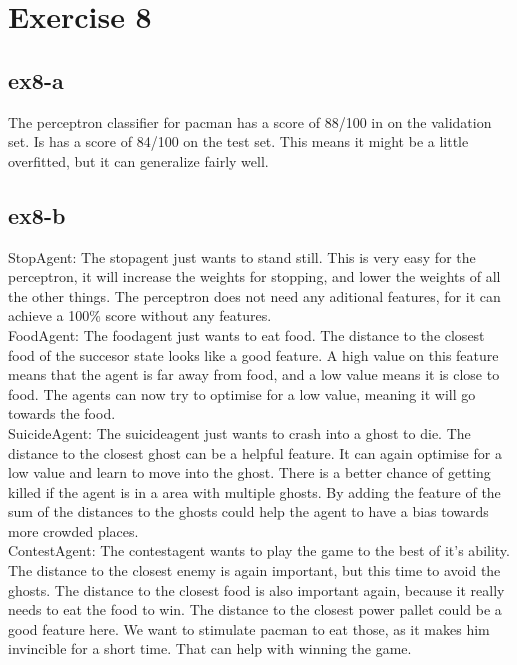 \section{Exercise 8}
\subsection{ex8-a}
The perceptron classifier for pacman has a score of 88/100 in on the validation set. Is has a score of 84/100 on the test set. This means it might be a little overfitted, but it can generalize fairly well.
\subsection{ex8-b}
StopAgent: The stopagent just wants to stand still. This is very easy for the perceptron, it will increase the weights for stopping, and lower the weights of all the other things. The perceptron does not need any aditional features, for it can achieve a 100\% score without any features. \\
FoodAgent: The foodagent just wants to eat food. The distance to the closest food of the succesor state looks like a good feature. A high value on this feature means that the agent is far away from food, and a low value means it is close to food. The agents can now try to optimise for a low value, meaning it will go towards the food. \\
SuicideAgent: The suicideagent just wants to crash into a ghost to die. The distance to the closest ghost can be a helpful feature. It can again optimise for a low value and learn to move into the ghost. There is a better chance of getting killed if the agent is in a area with multiple ghosts. By adding the feature of the sum of the distances to the ghosts could help the agent to have a bias towards more crowded places. \\
ContestAgent: The contestagent wants to play the game to the best of it's ability. The distance to the closest enemy is again important, but this time to avoid the ghosts. The distance to the closest food is also important again, because it really needs to eat the food to win. The distance to the closest power pallet could be a good feature here. We want to stimulate pacman to eat those, as it makes him invincible for a short time. That can help with winning the game. 
